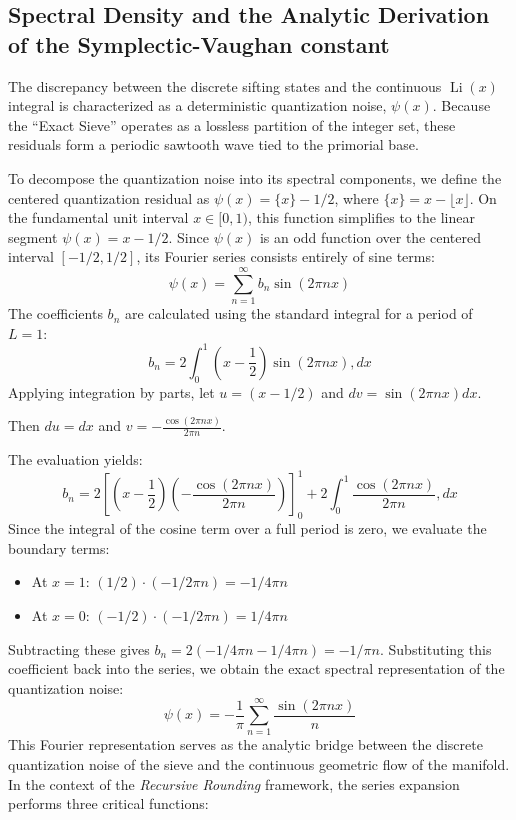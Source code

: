 \documentclass[sn-mathphys-num, pdflatex, referee]{sn-jnl}
\begin{document}
\subsection{Spectral Density and the Analytic Derivation of the Symplectic-Vaughan constant}
\label{sec:Spectral-Density}
The discrepancy between the discrete sifting states and the continuous $\operatorname{Li}(x)$ integral is characterized as a deterministic quantization noise, $\psi(x)$. Because the ``Exact Sieve'' operates as a lossless partition of the integer set, these residuals form a periodic sawtooth wave tied to the primorial base. 

To decompose the quantization noise into its spectral components, we define the centered quantization residual as $\psi(x) = \{x\} - 1/2$, 
where $\{x\} = x - \lfloor x \rfloor$. 
On the fundamental unit interval $x \in [0, 1)$, 
this function simplifies to the linear segment $\psi(x) = x - 1/2$. 
Since $\psi(x)$ is an odd function over the centered interval $[-1/2, 1/2]$, 
its Fourier series consists entirely of sine terms:
\begin{equation}
\psi(x) = \sum_{n=1}^{\infty} b_n \sin(2\pi nx)
\label{Fsine}
\end{equation}
The coefficients $b_n$ are calculated using the standard integral for a period of $L=1$:
\begin{equation}
b_n = 2 \int_{0}^{1} \left( x - \frac{1}{2} \right) \sin(2\pi nx) , dx
\end{equation}
Applying integration by parts, 
let $u = (x - 1/2)$ and $dv = \sin(2\pi nx)dx$.

Then $du = dx$ and $v = -\frac{\cos(2\pi nx)}{2\pi n}$. 

The evaluation yields:
\begin{equation}
b_n = 2 \left[ \left( x - \frac{1}{2} \right) \left( -\frac{\cos(2\pi nx)}{2\pi n} \right) \right]_0^1 + 2 \int_0^1 \frac{\cos(2\pi nx)}{2\pi n} , dx
\end{equation}
Since the integral of the cosine term over a full period is zero, we evaluate the boundary terms:
\begin{itemize}
\item At $x=1$: $(1/2) \cdot (-1/2\pi n) = -1/4\pi n$
\item At $x=0$: $(-1/2) \cdot (-1/2\pi n) = 1/4\pi n$
\end{itemize}
Subtracting these gives 
$b_n = 2(-1/4\pi n - 1/4\pi n) = -1/\pi n$. 
Substituting this coefficient back into the series, we obtain the exact spectral representation of the quantization noise:
\begin{equation}\psi(x) = -\frac{1}{\pi} \sum_{n=1}^{\infty} \frac{\sin(2\pi nx)}{n}
\end{equation}
This Fourier representation serves as the analytic bridge between the discrete quantization noise of the sieve and the continuous geometric flow of the manifold. In the context of the \textit{Recursive Rounding} framework, the series expansion performs three critical functions:
\end{document}
